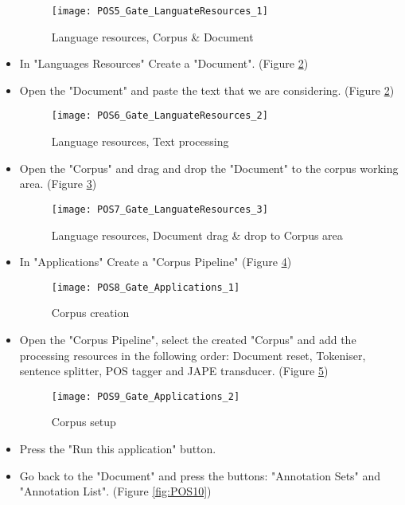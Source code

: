 \begin{itemize}
			\begin{figure}\centering
				\texttt{[image: POS5\_Gate\_LanguateResources\_1]}
				\caption{Language resources, Corpus \& Document}\label{fig:POS5}
			\end{figure}
		
		\item In "Languages Resources" Create a "Document". (Figure \ref{fig:POS6})
		\item Open the "Document" and paste the text that we are considering. (Figure \ref{fig:POS6})
		
			\begin{figure}\centering
				\texttt{[image: POS6\_Gate\_LanguateResources\_2]}
				\caption{Language resources, Text processing}\label{fig:POS6}
			\end{figure}
		
		\item Open the "Corpus" and drag and drop the "Document" to the corpus working area. (Figure \ref{fig:POS7})
		
			\begin{figure}\centering
				\texttt{[image: POS7\_Gate\_LanguateResources\_3]}
				\caption{Language resources, Document drag \& drop to Corpus area}\label{fig:POS7}
			\end{figure}
		
		\item In "Applications" Create a "Corpus Pipeline" (Figure \ref{fig:POS8})
		
			\begin{figure}\centering
				\texttt{[image: POS8\_Gate\_Applications\_1]}
				\caption{Corpus creation}\label{fig:POS8}
			\end{figure}
		
		\item Open the "Corpus Pipeline", select the created "Corpus" and add the processing resources in the following order: Document reset, Tokeniser, sentence splitter, POS tagger and JAPE transducer. (Figure \ref{fig:POS9})
		
			\begin{figure}\centering
				\texttt{[image: POS9\_Gate\_Applications\_2]}
				\caption{Corpus setup}\label{fig:POS9}
			\end{figure}
		
		\item Press the "Run this application" button.
		\item Go back to the "Document" and press the buttons: "Annotation Sets" and "Annotation List". (Figure \ref{fig:POS10})
		

\end{itemize}
